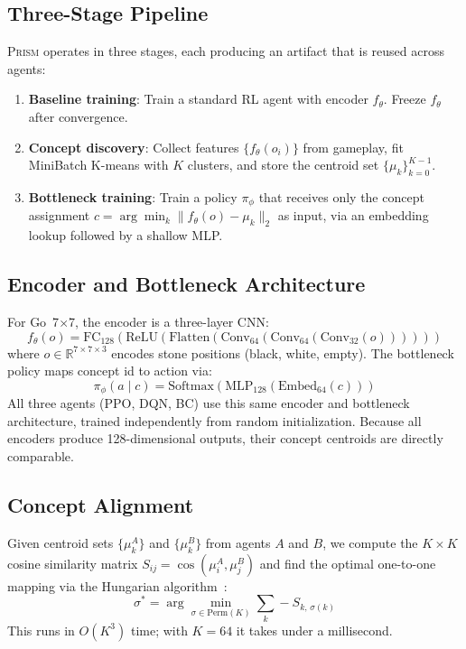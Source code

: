 \documentclass[11pt,a4paper]{article}
\newcommand{\prism}{\textsc{Prism}}
\begin{document}
\subsection{Three-Stage Pipeline}

\prism{} operates in three stages, each producing an artifact that is reused across agents:

\begin{enumerate}[leftmargin=*]
    \item \textbf{Baseline training}: Train a standard RL agent with encoder $f_\theta$. Freeze $f_\theta$ after convergence.
    \item \textbf{Concept discovery}: Collect features $\{f_\theta(o_i)\}$ from gameplay, fit MiniBatch K-means with $K$ clusters, and store the centroid set $\{\mu_k\}_{k=0}^{K-1}$.
    \item \textbf{Bottleneck training}: Train a policy $\pi_\phi$ that receives only the concept assignment $c = \arg\min_k \|f_\theta(o) - \mu_k\|_2$ as input, via an embedding lookup followed by a shallow MLP.
\end{enumerate}

\subsection{Encoder and Bottleneck Architecture}

For Go~7$\times$7, the encoder is a three-layer CNN:
\[
f_\theta(o) = \mathrm{FC}_{128}(\mathrm{ReLU}(\mathrm{Flatten}(\mathrm{Conv}_{64}(\mathrm{Conv}_{64}(\mathrm{Conv}_{32}(o))))))
\]
where $o \in \mathbb{R}^{7 \times 7 \times 3}$ encodes stone positions (black, white, empty). The bottleneck policy maps concept id to action via:
\[
\pi_\phi(a \mid c) = \mathrm{Softmax}(\mathrm{MLP}_{128}(\mathrm{Embed}_{64}(c)))
\]
All three agents (PPO, DQN, BC) use this same encoder and bottleneck architecture, trained independently from random initialization. Because all encoders produce 128-dimensional outputs, their concept centroids are directly comparable.

\subsection{Concept Alignment}
\label{sec:alignment}

Given centroid sets $\{\mu_k^A\}$ and $\{\mu_k^B\}$ from agents $A$ and $B$, we compute the $K \times K$ cosine similarity matrix $S_{ij} = \cos(\mu_i^A, \mu_j^B)$ and find the optimal one-to-one mapping via the Hungarian algorithm~\citep{kuhn1955hungarian}:
\[
\sigma^* = \arg\min_{\sigma \in \mathrm{Perm}(K)} \sum_k -S_{k,\,\sigma(k)}
\]
This runs in $O(K^3)$ time; with $K=64$ it takes under a millisecond.
\end{document}
